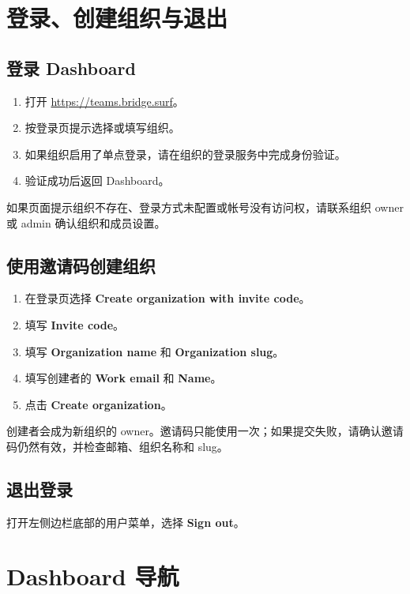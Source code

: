 \documentclass[UTF8,a4paper,11pt]{ctexart}
\begin{document}
\section{登录、创建组织与退出}

\subsection{登录 Dashboard}

\begin{enumerate}
  \item 打开 \url{https://teams.bridge.surf}。
  \item 按登录页提示选择或填写组织。
  \item 如果组织启用了单点登录，请在组织的登录服务中完成身份验证。
  \item 验证成功后返回 Dashboard。
\end{enumerate}

如果页面提示组织不存在、登录方式未配置或帐号没有访问权，请联系组织 owner 或 admin 确认组织和成员设置。

\subsection{使用邀请码创建组织}

\begin{enumerate}
  \item 在登录页选择 \textbf{Create organization with invite code}。
  \item 填写 \textbf{Invite code}。
  \item 填写 \textbf{Organization name} 和 \textbf{Organization slug}。
  \item 填写创建者的 \textbf{Work email} 和 \textbf{Name}。
  \item 点击 \textbf{Create organization}。
\end{enumerate}

创建者会成为新组织的 owner。邀请码只能使用一次；如果提交失败，请确认邀请码仍然有效，并检查邮箱、组织名称和 slug。

\subsection{退出登录}

打开左侧边栏底部的用户菜单，选择 \textbf{Sign out}。

\section{Dashboard 导航}
\end{document}
